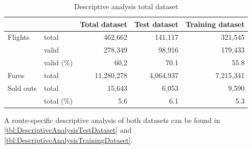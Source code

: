 \begin{table}
\centering
\footnotesize
\begin{tabular}{l l r r r}
    \toprule
    ~         &  ~          &  Total dataset  & Test dataset  &  Training dataset \\ 
    \midrule
    Flights   &  total      &  462,662    &  141,117    & 321,545 \\
    ~         &  valid      &  278,349    &  98,916     & 179,433 \\
    ~         &  valid (\%) &  60,2       &  70.1       & 55.8 \\
    Fares     &  total      &  11,280,278 &  4,064,937  & 7,215,341 \\
    Sold outs &  total      &  15,643     &  6,053      & 9,590 \\
    ~         &  total (\%) &  5.6        &  6.1        &  5.3 \\
    \bottomrule
\end{tabular}
\caption{Descriptive analysis total dataset}
\label{tbl:DescriptiveAnalysisTotalDataset}
\end{table}


A route-specific descriptive analysis of both datasets can be found in \autoref{tbl:DescriptiveAnalysisTestDataset} and \autoref{tbl:DescriptiveAnalysisTrainingDataset}.


